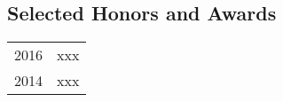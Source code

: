 \documentclass[margin,line]{res}
\begin{document}
\begin{resume}
\section{\sc Selected Honors and Awards}
\begin{tabular}{ l p{5.05in}}
2016 & xxx\\
2014 & xxx\\
\end{tabular}
\vspace*{-0.1in}

\end{resume}
\end{document}
